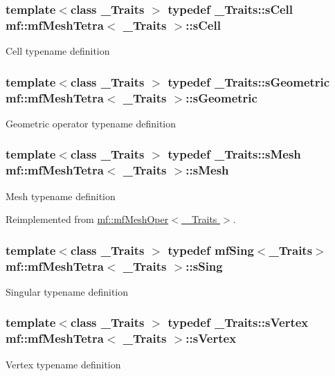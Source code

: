 \hypertarget{classmf_1_1mfMeshTetra_a3d0b16a5e1666b21e408c3f2e6beac3d}{
\subsubsection[{sCell}]{\setlength{\rightskip}{0pt plus 5cm}template$<$class \_\-Traits $>$ typedef \_\-Traits::sCell {\bf mf::mfMeshTetra}$<$ \_\-Traits $>$::{\bf sCell}}}
\label{classmf_1_1mfMeshTetra_a3d0b16a5e1666b21e408c3f2e6beac3d}
Cell typename definition \hypertarget{classmf_1_1mfMeshTetra_aebc07dc4fa46c943b52b4fead1a7927c}{
\subsubsection[{sGeometric}]{\setlength{\rightskip}{0pt plus 5cm}template$<$class \_\-Traits $>$ typedef \_\-Traits::sGeometric {\bf mf::mfMeshTetra}$<$ \_\-Traits $>$::{\bf sGeometric}}}
\label{classmf_1_1mfMeshTetra_aebc07dc4fa46c943b52b4fead1a7927c}
Geometric operator typename definition \hypertarget{classmf_1_1mfMeshTetra_a1b1ccf8633127e7307c35b150a522193}{
\subsubsection[{sMesh}]{\setlength{\rightskip}{0pt plus 5cm}template$<$class \_\-Traits $>$ typedef \_\-Traits::sMesh {\bf mf::mfMeshTetra}$<$ \_\-Traits $>$::{\bf sMesh}}}
\label{classmf_1_1mfMeshTetra_a1b1ccf8633127e7307c35b150a522193}
Mesh typename definition 

Reimplemented from \hyperlink{classmf_1_1mfMeshOper_a96c05da9a054cf9ac58d15211922f936}{mf::mfMeshOper$<$ \_\-Traits $>$}.

\hypertarget{classmf_1_1mfMeshTetra_a85faa5c67167ee9364e5940f320a2693}{
\subsubsection[{sSing}]{\setlength{\rightskip}{0pt plus 5cm}template$<$class \_\-Traits $>$ typedef {\bf mfSing}$<$\_\-Traits$>$ {\bf mf::mfMeshTetra}$<$ \_\-Traits $>$::{\bf sSing}}}
\label{classmf_1_1mfMeshTetra_a85faa5c67167ee9364e5940f320a2693}
Singular typename definition \hypertarget{classmf_1_1mfMeshTetra_af6163ef8da6cda46de096af87fd82a55}{
\subsubsection[{sVertex}]{\setlength{\rightskip}{0pt plus 5cm}template$<$class \_\-Traits $>$ typedef \_\-Traits::sVertex {\bf mf::mfMeshTetra}$<$ \_\-Traits $>$::{\bf sVertex}}}
\label{classmf_1_1mfMeshTetra_af6163ef8da6cda46de096af87fd82a55}
Vertex typename definition 

